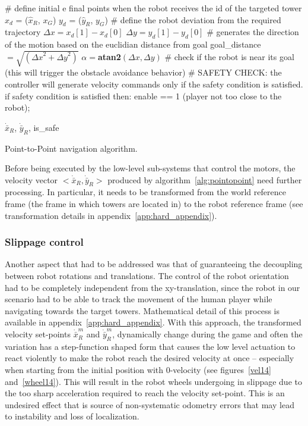 \begin{algorithm}[ht]
	\# define initial e final points when the robot receives the id of the targeted tower \;
	$x_d$ = ($\hat{x}_R$, $x_G$)\;
	$y_d$ = ($\hat{y}_R$, $y_G$)\;
	\# define the robot deviation from the required trajectory\;
	$\Delta x = x_d[1] - x_d[0]$\;
	$\Delta y = y_d[1] - y_d[0]$\;
	\# generates the direction of the motion based on the euclidian distance from goal\;
	goal\_distance$ = \sqrt{({\Delta x}^2 + {\Delta y}^2)}$\;
	$\alpha = $\textbf{atan2}$(\Delta x, \Delta y)$\;
	\# check if the robot is near its goal (this will trigger the obstacle avoidance behavior)\;
	\# SAFETY CHECK: the controller will generate velocity commands only if the safety condition is satisfied. if safety condition is satisfied then: enable == 1 (player not too close to the robot);\;
	
	\Return $\dot{\bar{x}}_R$, $\dot{\bar{y}}_R$, is\_safe 
	\caption{Point-to-Point navigation algorithm.}
	\label{alg:pointopoint}
\end{algorithm}

Before being executed by the low-level sub-systems that control the motors, the velocity vector $<\dot{\bar{x}}_R,\dot{\bar{y}}_R>$ produced by algorithm~\ref{alg:pointopoint} need further processing. In particular, it needs to be transformed from the world reference frame (the frame in which towers are located in) to the robot reference frame (see transformation details in appendix~\ref{app:hard_appendix}).

\subsubsection{Slippage control} \label{sec:obt_avoidance}
Another aspect that had to be addressed was that of guaranteeing the decoupling between robot rotations and translations. %
The control of the robot orientation had to be completely independent from the xy-translation, since the robot in our scenario had to be able to track the movement of the human player while navigating towards the target towers. Mathematical detail of this process is available in appendix~\ref{app:hard_appendix}. With this approach, the transformed velocity set-points $\dot{\bar{x}}_R^m$ and $\dot{\bar{y}}_R^m$, dynamically change during the game and often the variation has a step-function shaped form that causes the low level actuation to react violently to make the robot reach the desired velocity at once -- especially when starting from the initial position with 0-velocity (see figures~\ref{vel14} and~\ref{wheel14}). This will result in the robot wheels undergoing in slippage due to the too sharp acceleration required to reach the velocity set-point. This is an undesired effect that is source of non-systematic odometry errors that may lead to instability and loss of localization. 

